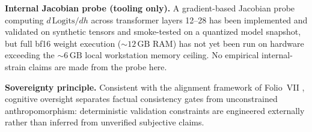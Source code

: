 \documentclass[11pt]{article}
\begin{document}
\noindent\textbf{Internal Jacobian probe (tooling only).} A gradient-based Jacobian probe computing $d\,\mathrm{Logits}/dh$ across transformer layers 12--28 has been implemented and validated on synthetic tensors and smoke-tested on a quantized model snapshot, but full bf16 weight execution ($\sim 12\,\mathrm{GB}$ RAM) has not yet been run on hardware exceeding the $\sim 6\,\mathrm{GB}$ local workstation memory ceiling. No empirical internal-strain claims are made from the probe here.

\noindent\textbf{Sovereignty principle.} Consistent with the alignment framework of Folio~VII \cite{folio-vii}, cognitive oversight separates factual consistency gates from unconstrained anthropomorphism: deterministic validation constraints are engineered externally rather than inferred from unverified subjective claims.
\end{document}
